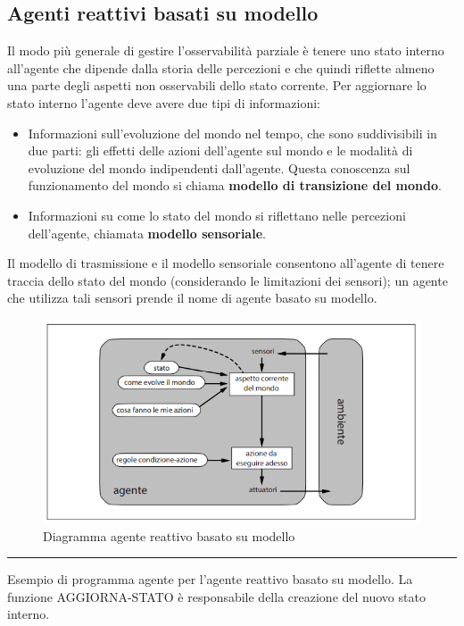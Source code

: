 \documentclass{article}
\begin{document}
\subsection{Agenti reattivi basati su modello}
Il modo più generale di gestire l'osservabilità parziale è tenere uno stato interno all'agente che dipende dalla storia delle percezioni e che quindi riflette almeno una parte degli aspetti non osservabili dello stato corrente. Per aggiornare lo stato interno l'agente deve avere due tipi di informazioni:
\begin{itemize}
    \item Informazioni sull'evoluzione del mondo nel tempo, che sono suddivisibili in due parti: gli effetti delle azioni dell'agente sul mondo e le modalità di evoluzione del mondo indipendenti dall'agente. Questa conoscenza sul funzionamento del mondo si chiama \textbf{modello di transizione del mondo}.
    \item Informazioni su come lo stato del mondo si riflettano nelle percezioni dell'agente, chiamata \textbf{modello sensoriale}.
\end{itemize}
\noindent Il modello di trasmissione e il modello sensoriale consentono all'agente di tenere traccia dello stato del mondo (considerando le limitazioni dei sensori); un agente che utilizza tali sensori prende il nome di agente basato su modello.
\begin{figure}[H]
    \centering
    \includegraphics[width=0.5\linewidth]{Images/AgenteReattivoBasatoSuModello.png}
    \caption{Diagramma agente reattivo basato su modello}
    \label{fig:enter-label}
\end{figure}
\par\noindent\rule{\textwidth}{0.4pt}
\noindent Esempio di programma agente per l'agente reattivo basato su modello. La funzione AGGIORNA-STATO è responsabile della creazione del nuovo stato interno.
\newpage
\end{document}
